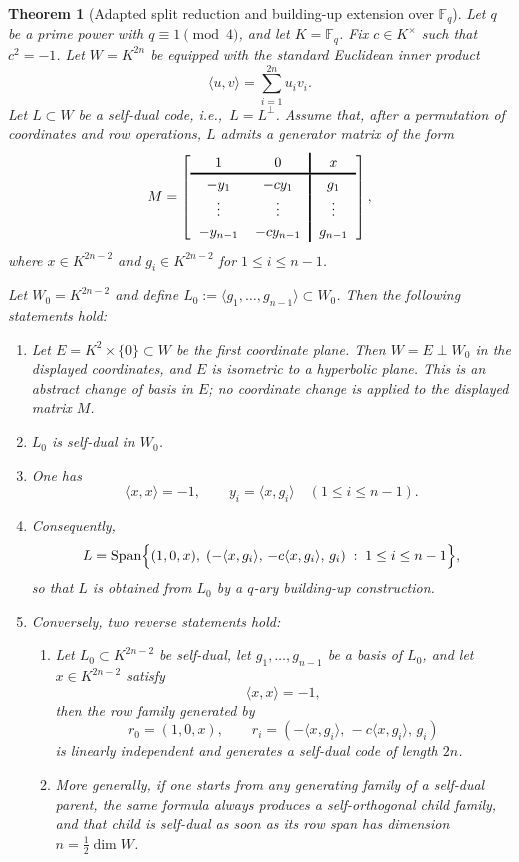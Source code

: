 \documentclass[12pt]{article}
\newtheorem{theorem}{Theorem}[section]
\newenvironment{blueblock}{\begingroup\color{blue}}{\endgroup}
\begin{document}
\begin{theorem}[Adapted split reduction and building-up extension over $\mathbb{F}_q$]\label{thm:qary-building-up}
Let $q$ be a prime power with $q \equiv 1 \pmod{4}$, and let $K=\mathbb{F}_q$.
Fix $c \in K^\times$ such that $c^2=-1$.
Let $W=K^{2n}$ be equipped with the standard Euclidean inner product
\[
\langle u,v\rangle = \sum_{i=1}^{2n} u_i v_i.
\]
Let $L \subset W$ be a self-dual code, i.e.,\ $L=L^\perp$. Assume that,
after a permutation of coordinates and row operations, \(L\) admits a
generator matrix of the form
\[
\begingroup
\setlength{\arraycolsep}{6pt}
\renewcommand{\arraystretch}{1.2}
M=
\left[
\begin{array}{cc!{\vrule width 1.2pt}c}
1 & 0 & x\\
\noalign{\hrule height 1.2pt}
-y_1 & -c y_1 & g_1\\
\vdots & \vdots & \vdots\\
-y_{n-1} & -c y_{n-1} & g_{n-1}
\end{array}
\right]
\endgroup,
\]
where $x \in K^{2n-2}$ and $g_i \in K^{2n-2}$ for $1 \le i \le n-1$.

Let $W_0 = K^{2n-2}$ and define $L_0 := \langle g_1,\dots,g_{n-1}\rangle \subset W_0$.
Then the following statements hold:
\begin{enumerate}
\item Let \(E=K^2\times\{0\}\subset W\) be the first coordinate plane.
Then \(W=E\perp W_0\) in the displayed coordinates, and \(E\) is
isometric to a hyperbolic plane.  This is an abstract change of basis in
\(E\); no coordinate change is applied to the displayed matrix \(M\).
\item $L_0$ is self-dual in $W_0$.
\item One has
\[
\langle x,x\rangle=-1,
\qquad
y_i = \langle x, g_i\rangle\quad(1\le i\le n-1).
\]
\item Consequently,
\[
L = \operatorname{Span}\Bigl\{(1,0,x),\;
(-\langle x,g_i\rangle,\,-c\langle x,g_i\rangle,\,g_i)\;:\;1 \le i \le n-1\Bigr\},
\]
so that $L$ is obtained from $L_0$ by a $q$-ary building-up construction.
\item Conversely, two reverse statements hold:
\begin{enumerate}[label=(5\alph*)]
\item Let $L_0 \subset K^{2n-2}$ be self-dual, let $g_1,\dots,g_{n-1}$ be a basis of $L_0$, and let $x \in K^{2n-2}$ satisfy
\[
\langle x,x\rangle = -1,
\]
then the row family generated by
\[
r_0 = (1,0,x), \qquad
r_i = (-\langle x,g_i\rangle,\,-c\langle x,g_i\rangle,\,g_i)
\]
is linearly independent and generates a self-dual code of length $2n$.
\item More generally, if one starts from any generating family of a self-dual parent, the same formula always produces a self-orthogonal child family, and that child is self-dual as soon as its row span has dimension $n=\frac12 \dim W$.
\end{enumerate}
\end{enumerate}
\end{theorem}
\end{document}
